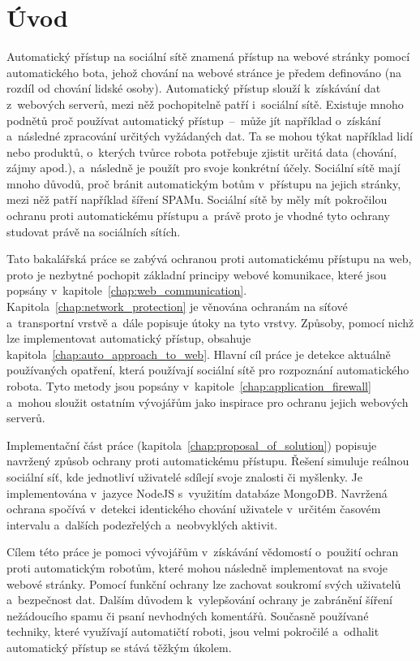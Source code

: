 \chapter{Úvod}

Automatický přístup na sociální sítě znamená přístup na webové stránky pomocí automatického bota, jehož chování na webové stránce je předem definováno (na rozdíl od chování lidské osoby). Automatický přístup slouží k~získávání dat z~webových serverů, mezi něž pochopitelně patří i~sociální sítě. Existuje mnoho podnětů proč používat automatický přístup~--~může jít například o~získání a~následné zpracování určitých vyžádaných dat. Ta se mohou týkat například lidí nebo produktů, o~kterých tvůrce robota potřebuje zjistit určitá data (chování, zájmy apod.), a~následně je použít pro svoje konkrétní účely. Sociální sítě mají mnoho důvodů, proč bránit automatickým botům v~přístupu na jejich stránky, mezi něž patří například šíření SPAMu. Sociální sítě by měly mít pokročilou ochranu proti automatickému přístupu a~právě proto je vhodné tyto ochrany studovat právě na sociálních sítích.

Tato bakalářská práce se zabývá ochranou proti automatickému přístupu na web, proto je nezbytné pochopit základní principy webové komunikace, které jsou popsány v~kapitole~\ref{chap:web_communication}. Kapitola~\ref{chap:network_protection} je věnována ochranám na síťové a~transportní vrstvě a~dále popisuje útoky na tyto vrstvy. Způsoby, pomocí nichž lze implementovat automatický přístup, obsahuje kapitola~\ref{chap:auto_approach_to_web}. Hlavní cíl práce je detekce aktuálně používaných opatření, která používají sociální sítě pro rozpoznání automatického robota. Tyto metody jsou popsány v~kapitole~\ref{chap:application_firewall} a~mohou sloužit ostatním vývojářům jako inspirace pro ochranu jejich webových serverů. 

Implementační část práce (kapitola~\ref{chap:proposal_of_solution}) popisuje navržený způsob ochrany proti automatickému přístupu. Řešení simuluje reálnou sociální síť, kde jednotliví uživatelé sdílejí svoje znalosti či myšlenky. Je implementována v~jazyce NodeJS s~využitím databáze MongoDB. Navržená ochrana spočívá v~detekci identického chování uživatele v~určitém časovém intervalu a~dalších podezřelých a~neobvyklých aktivit.

Cílem této práce je pomoci vývojářům v~získávání vědomostí o~použití ochran proti automatickým robotům, které mohou následně implementovat na svoje webové stránky. Pomocí funkční ochrany lze zachovat soukromí svých uživatelů a~bezpečnost dat. Dalším důvodem k~vylepšování ochrany je zabránění šíření nežádoucího spamu či psaní nevhodných komentářů. Současně používané techniky, které využívají automatičtí roboti, jsou velmi pokročilé a~odhalit automatický přístup se stává těžkým úkolem.

